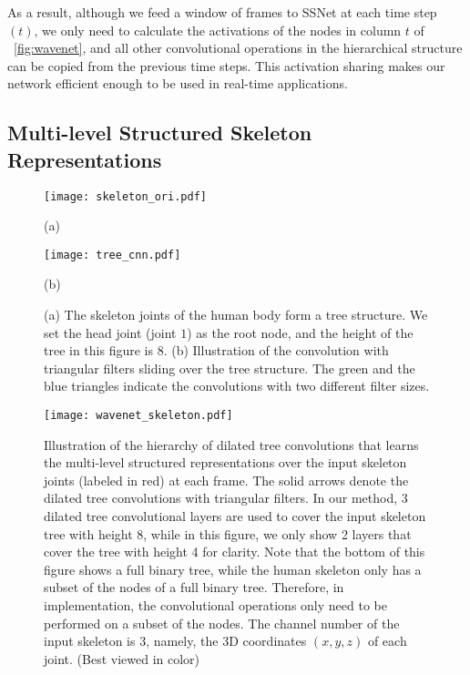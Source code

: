 \documentclass[10pt,twocolumn,letterpaper]{article}
\begin{document}
As a result, although we feed a window of frames to SSNet at each time step $(t)$,
we only need to calculate the activations of the nodes in column $t$ of \figurename{~\ref{fig:wavenet}},
and all other convolutional operations in the hierarchical structure can be copied from the previous time steps.
This activation sharing makes our network efficient enough to be used in real-time applications.

\subsection{Multi-level Structured Skeleton Representations}
\label{sec:method:treeCNN}

\begin{figure}[tp]
    \begin{minipage}[b]{0.45\linewidth}
		\centering
		\centerline{\texttt{[image: skeleton\_ori.pdf]}}
        (a)
	\end{minipage}
	\begin{minipage}[b]{0.549\linewidth}
		\centering
		\centerline{\texttt{[image: tree\_cnn.pdf]}}
         (b)
	\end{minipage}
\caption{
(a) The skeleton joints of the human body form a tree structure.
We set the head joint (joint $1$) as the root node,
and the height of the tree in this figure is $8$.
(b) Illustration of the convolution with triangular filters sliding over the tree structure.
The green and the blue triangles indicate the convolutions with two different filter sizes.
}
	\label{fig:skeleton_tree_strucutre}
\end{figure}


\begin{figure}[tp]
	\centerline{\texttt{[image: wavenet\_skeleton.pdf]}}
	\caption{
Illustration of the hierarchy of dilated tree convolutions that learns the multi-level structured representations over the input skeleton joints (labeled in red) at each frame.
The solid arrows denote the dilated tree convolutions with triangular filters. In our method, 3 dilated tree convolutional layers are used to cover the input skeleton tree with height 8,
while in this figure, we only show 2 layers that cover the tree with height 4 for clarity.
Note that the bottom of this figure shows a full binary tree,
while the human skeleton only has a subset of the nodes of a full binary tree.
Therefore, in implementation, the convolutional operations only need to be performed on a subset of the nodes.
The channel number of the input skeleton is 3, namely, the 3D coordinates $(x, y, z)$ of each joint.
(Best viewed in color)
}
	\label{fig:wavenetSkeleton}
\end{figure}
\end{document}
